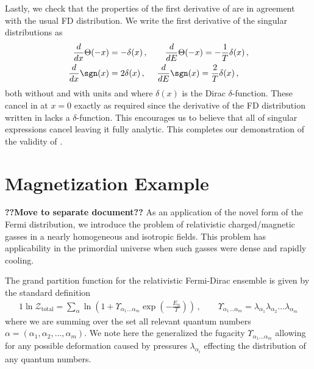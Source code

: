 Lastly, we check that the properties of the first derivative of  are in agreement with the usual FD distribution. We write the first derivative of the singular distributions as 
\begin{align}
\label{NFF1b}
\frac{d}{dx}\Theta(-x)&=-\delta(x)\,,\qquad 
\frac{d}{dE}\Theta(-x)=-\frac{1}{T}\delta(x)\,,\\
\frac{d}{dx}\sgn(x)&=2\delta(x)\,,\,\,\quad 
\frac{d}{dE}\sgn(x)=\frac{2}{T}\delta(x)\,,
\end{align}
both without and with units and where $\delta(x)$ is the Dirac $\delta$-function. These cancel in  at $x=0$ exactly as required since the derivative of the FD distribution written in  lacks a $\delta$-function. This encourages us to believe that all of singular expressions cancel leaving it fully analytic. This completes our demonstration of the validity of .

\section{Magnetization Example}
\label{magnetization}
{\bf ??Move to separate document??}
\noindent As an application of the novel form of the Fermi distribution, we introduce the problem of relativistic charged/magnetic gasses in a nearly homogeneous and isotropic fields. This problem has applicability in the primordial universe when such gasses were dense and rapidly cooling.

The grand partition function for the relativistic Fermi-Dirac ensemble is given by the standard definition
\begin{alignat}{1}
    \label{part:1} \ln\mathcal{Z}_\mathrm{total}=\sum_{\alpha}\ln\left(1+\Upsilon_{\alpha_{1}\ldots\alpha_{m}}\exp\left(-\frac{E_{\alpha}}{T}\right)\right)\,,\qquad\Upsilon_{\alpha_{1}\ldots\alpha_{m}}=\lambda_{\alpha_{1}}\lambda_{\alpha_{2}}\ldots\lambda_{\alpha_{m}}
\end{alignat}
where we are summing over the set all relevant quantum numbers $\alpha=(\alpha_{1},\alpha_{2},\ldots,\alpha_{m})$. We note here the generalized the fugacity $\Upsilon_{\alpha_{1}\ldots\alpha_{m}}$ allowing for any possible deformation caused by pressures $\lambda_{\alpha_{i}}$ effecting the distribution of any quantum numbers.

